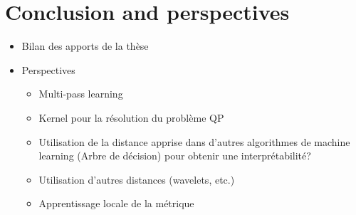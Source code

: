 \chapter*{Conclusion and perspectives}
\label{sec:conclusion}

\begin{itemize}
	\item Bilan des apports de la thèse
	\item Perspectives
	\begin{itemize}
		\item Multi-pass learning
		\item Kernel pour la résolution du problème QP
		\item Utilisation de la distance apprise dans d'autres algorithmes de machine learning (Arbre de décision) pour obtenir une interprétabilité?
		\item Utilisation d'autres distances (wavelets, etc.)
		\item Apprentissage locale de la métrique
	\end{itemize}
\end{itemize}

